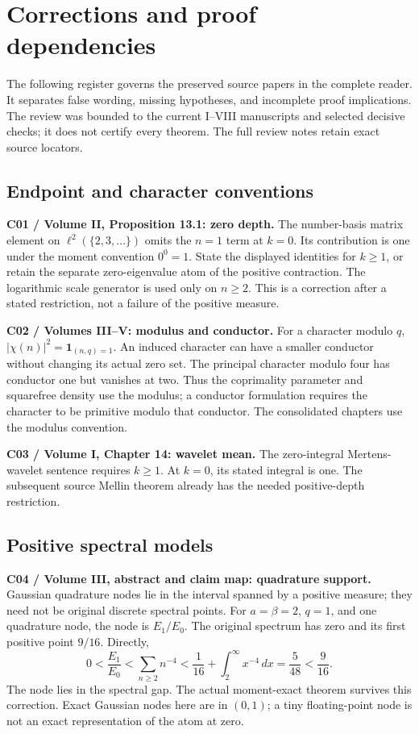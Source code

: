 \chapter{Corrections and proof dependencies}

The following register governs the preserved source papers in the complete reader. It separates false wording, missing hypotheses, and incomplete proof implications. The review was bounded to the current I--VIII manuscripts and selected decisive checks; it does not certify every theorem. The full review notes retain exact source locators.

\section{Endpoint and character conventions}

\textbf{C01 / Volume II, Proposition 13.1: zero depth.}
The number-basis matrix element on $\ell^2(\{2,3,\ldots\})$ omits the $n=1$ term at $k=0$. Its contribution is one under the moment convention $0^0=1$. State the displayed identities for $k\ge1$, or retain the separate zero-eigenvalue atom of the positive contraction. The logarithmic scale generator is used only on $n\ge2$. This is a correction after a stated restriction, not a failure of the positive measure.

\textbf{C02 / Volumes III--V: modulus and conductor.}
For a character modulo $q$, $|\chi(n)|^2=\boldsymbol 1_{(n,q)=1}$. An induced character can have a smaller conductor without changing its actual zero set. The principal character modulo four has conductor one but vanishes at two. Thus the coprimality parameter and squarefree density use the modulus; a conductor formulation requires the character to be primitive modulo that conductor. The consolidated chapters use the modulus convention.

\textbf{C03 / Volume I, Chapter 14: wavelet mean.}
The zero-integral Mertens-wavelet sentence requires $k\ge1$. At $k=0$, its stated integral is one. The subsequent source Mellin theorem already has the needed positive-depth restriction.

\section{Positive spectral models}

\textbf{C04 / Volume III, abstract and claim map: quadrature support.}
Gaussian quadrature nodes lie in the interval spanned by a positive measure; they need not be original discrete spectral points. For $a=\beta=2$, $q=1$, and one quadrature node, the node is $E_1/E_0$. The original spectrum has zero and its first positive point $9/16$. Directly,
\[
0<\frac{E_1}{E_0}<\sum_{n\ge2}n^{-4}
<\frac1{16}+\int_2^\infty x^{-4}\,dx
=\frac5{48}<\frac9{16}.
\]
The node lies in the spectral gap. The actual moment-exact theorem survives this correction. Exact Gaussian nodes here are in $(0,1)$; a tiny floating-point node is not an exact representation of the atom at zero.

